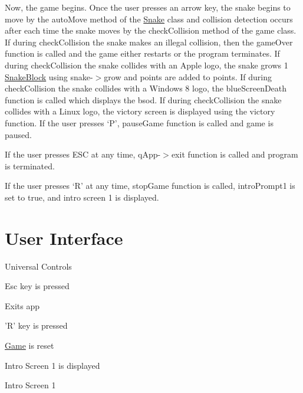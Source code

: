 \-Now, the game begins. \-Once the user presses an arrow key, the snake begins to move by the auto\-Move method of the \hyperlink{classSnake}{\-Snake} class and collision detection occurs after each time the snake moves by the check\-Collision method of the game class. \-If during check\-Collision the snake makes an illegal collision, then the game\-Over function is called and the game either restarts or the program terminates. \-If during check\-Collision the snake collides with an \-Apple logo, the snake grows 1 \hyperlink{classSnakeBlock}{\-Snake\-Block} using snake-\/$>$grow and points are added to points. \-If during check\-Collision the snake collides with a \-Windows 8 logo, the blue\-Screen\-Death function is called which displays the bsod. \-If during check\-Collision the snake collides with a \-Linux logo, the victory screen is displayed using the victory function. \-If the user presses ‘\-P’, pause\-Game function is called and game is paused. 

\-If the user presses \-E\-S\-C at any time, q\-App-\/$>$exit function is called and program is terminated. 

\-If the user presses ‘\-R’ at any time, stop\-Game function is called, intro\-Prompt1 is set to true, and intro screen 1 is displayed.



 \hypertarget{index_UI}{}\section{\-User Interface}\label{index_UI}
\-Universal \-Controls
\begin{DoxyItemize}
\item \-Esc key is pressed
\begin{DoxyItemize}
\item \-Exits app
\end{DoxyItemize}
\item '\-R' key is pressed
\begin{DoxyItemize}
\item \hyperlink{classGame}{\-Game} is reset
\item \-Intro \-Screen 1 is displayed
\end{DoxyItemize}
\end{DoxyItemize}

\-Intro \-Screen 1 

